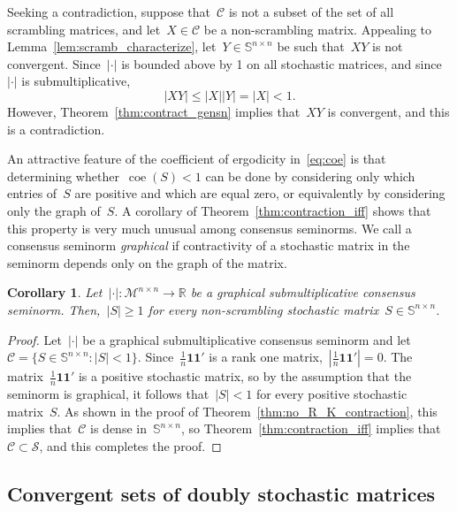 \documentclass[letterpaper, 10 pt, conference]{ieeeconf}  %
\newtheorem{corollary}{Corollary}
\newcommand{\R}{\mathbb R}
\newcommand{\gensn}[1]{|#1|} %
\DeclareMathOperator{\coe}{coe} %
\newcommand{\eqrowsum}{\mathcal{M}} %
\newcommand{\stoc}{\mathbb{S}} %
\newcommand{\stocscr}{\mathcal{S}} %
\begin{document}
    Seeking a contradiction, suppose that~$\mathcal{C}$ is not a subset of the set of all scrambling matrices, and let~$X \in \mathcal{C}$ be a non-scrambling matrix. Appealing to Lemma~\ref{lem:scramb_characterize}, let~$Y \in \stoc^{n \times n}$ be such that~$XY$ is not convergent. Since~$\gensn{\cdot}$ is bounded above by 1 on all stochastic matrices, and since~$\gensn{\cdot}$ is submultiplicative,
    \begin{equation}
        \gensn{XY} \le \gensn{X}\gensn{Y} = \gensn{X} < 1.
    \end{equation}
    However, Theorem~\ref{thm:contract_gensn} implies that~$XY$ is convergent, and this is a contradiction.
    \hspace*{\fill}~\QED

An attractive feature of the coefficient of ergodicity in~\eqref{eq:coe} is that determining whether~$\coe(S) < 1$ can be done by considering only which entries of~$S$ are positive and which are equal zero, or equivalently by considering only the graph of~$S$. A corollary of Theorem~\ref{thm:contraction_iff} shows that this property is very much unusual among consensus seminorms. We call a consensus seminorm \emph{graphical} if contractivity of a stochastic matrix in the seminorm depends only on the graph of the matrix.
\begin{corollary}
    Let~$\gensn{\cdot}: \eqrowsum^{n \times n} \to \R$ be a graphical submultiplicative consensus seminorm. Then,~$\gensn{S} \ge 1$ for every non-scrambling stochastic matrix~$S \in \stoc^{n \times n}$.
\end{corollary}
\begin{proof}
    Let~$\gensn{\cdot}$ be a graphical submultiplicative consensus seminorm and let~$\mathcal{C} = \{S \in \stoc^{n \times n} : \gensn{S} < 1\}$. Since~$\frac{1}{n} \mathbf{1}\mathbf{1}'$ is a rank one matrix,~$\gensn{\frac{1}{n}\mathbf{1}\mathbf{1}'} = 0$. The matrix~$\frac{1}{n} \mathbf{1}\mathbf{1}'$ is a positive stochastic matrix, so by the assumption that the seminorm is graphical, it follows that~$\gensn{S} < 1$ for every positive stochastic matrix~$S$. As shown in the proof of Theorem~\ref{thm:no_R_K_contraction}, this implies that~$\mathcal{C}$ is dense in~$\stoc^{n \times n}$, so Theorem~\ref{thm:contraction_iff} implies that~$\mathcal{C} \subset \stocscr$, and this completes the proof.
\end{proof}

\subsection{Convergent sets of doubly stochastic matrices}
\end{document}
